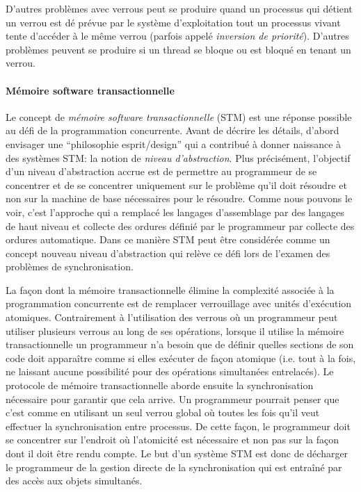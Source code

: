 D'autres problèmes avec verrous peut se produire quand un processus qui détient un verrou est dé prévue
par le système d'exploitation tout un processus vivant tente d'accéder à le même verrou (parfois appelé \emph{inversion de priorité}).
D'autres problèmes peuvent se produire si un thread se bloque ou est bloqué en tenant un verrou.

\paragraph{Mémoire software transactionnelle}
Le concept de \emph{mémoire software transactionnelle} (STM) est une réponse possible au défi de la programmation concurrente.
Avant de décrire les détails, d'abord envisager une ``philosophie esprit/design'' qui a contribué à donner naissance à des systèmes STM: la notion de \emph{niveau d'abstraction}.
Plus précisément, l'objectif d'un niveau d'abstraction accrue est de permettre au programmeur de se concentrer
et de se concentrer uniquement sur le problème qu'il doit résoudre et non sur la machine de base nécessaires pour le résoudre.
Comme nous pouvons le voir, c'est l'approche qui a remplacé les langages d'assemblage par des langages de haut niveau et collecte des ordures définié par le programmeur par collecte des ordures automatique.
Dans ce manière STM peut être considérée comme un concept nouveau niveau d'abstraction qui relève ce défi lors de l'examen des problèmes de synchronisation.


La façon dont la mémoire transactionnelle élimine la complexité associée à la programmation concurrente est de remplacer verrouillage avec unités d'exécution atomiques.
Contrairement à l'utilisation des verrous où un programmeur peut utiliser plusieurs verrous au long de ses opérations, lorsque il utilise la mémoire transactionnelle un programmeur n'a besoin que
de définir quelles sections de son code doit apparaître comme si elles exécuter de façon atomique (i.e. tout à la fois, ne laissant aucune possibilité pour des opérations simultanées entrelacés).
Le protocole de mémoire transactionnelle aborde ensuite la synchronisation nécessaire pour garantir que cela arrive.
Un programmeur pourrait penser que c'est comme en utilisant un seul verrou global où toutes les fois qu'il veut effectuer la synchronisation entre processus.
De cette façon, le programmeur doit se concentrer sur l'endroit où l'atomicité est nécessaire et non pas sur la façon dont il doit être rendu compte.
Le but d'un système STM est donc de décharger le programmeur de la gestion directe de la synchronisation qui est entraîné par des accès aux objets simultanés.


